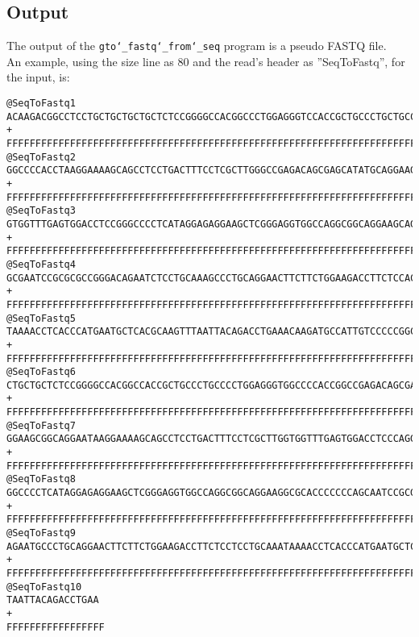 \subsection*{Output}
The output of the \texttt{gto\char`_fastq\char`_from\char`_seq} program is a pseudo FASTQ file.\\
An example, using the size line as 80 and the read's header as ''SeqToFastq'', for the input, is:
\begin{lstlisting}
@SeqToFastq1
ACAAGACGGCCTCCTGCTGCTGCTGCTCTCCGGGGCCACGGCCCTGGAGGGTCCACCGCTGCCCTGCTGCCATTGTCCCC
+
FFFFFFFFFFFFFFFFFFFFFFFFFFFFFFFFFFFFFFFFFFFFFFFFFFFFFFFFFFFFFFFFFFFFFFFFFFFFFFFF
@SeqToFastq2
GGCCCCACCTAAGGAAAAGCAGCCTCCTGACTTTCCTCGCTTGGGCCGAGACAGCGAGCATATGCAGGAAGCGGCAGGAA
+
FFFFFFFFFFFFFFFFFFFFFFFFFFFFFFFFFFFFFFFFFFFFFFFFFFFFFFFFFFFFFFFFFFFFFFFFFFFFFFFF
@SeqToFastq3
GTGGTTTGAGTGGACCTCCGGGCCCCTCATAGGAGAGGAAGCTCGGGAGGTGGCCAGGCGGCAGGAAGCAGGCCAGTGCC
+
FFFFFFFFFFFFFFFFFFFFFFFFFFFFFFFFFFFFFFFFFFFFFFFFFFFFFFFFFFFFFFFFFFFFFFFFFFFFFFFF
@SeqToFastq4
GCGAATCCGCGCGCCGGGACAGAATCTCCTGCAAAGCCCTGCAGGAACTTCTTCTGGAAGACCTTCTCCACCCCCCCAGC
+
FFFFFFFFFFFFFFFFFFFFFFFFFFFFFFFFFFFFFFFFFFFFFFFFFFFFFFFFFFFFFFFFFFFFFFFFFFFFFFFF
@SeqToFastq5
TAAAACCTCACCCATGAATGCTCACGCAAGTTTAATTACAGACCTGAAACAAGATGCCATTGTCCCCCGGCCTCCTGCTG
+
FFFFFFFFFFFFFFFFFFFFFFFFFFFFFFFFFFFFFFFFFFFFFFFFFFFFFFFFFFFFFFFFFFFFFFFFFFFFFFFF
@SeqToFastq6
CTGCTGCTCTCCGGGGCCACGGCCACCGCTGCCCTGCCCCTGGAGGGTGGCCCCACCGGCCGAGACAGCGAGCATATGCA
+
FFFFFFFFFFFFFFFFFFFFFFFFFFFFFFFFFFFFFFFFFFFFFFFFFFFFFFFFFFFFFFFFFFFFFFFFFFFFFFFF
@SeqToFastq7
GGAAGCGGCAGGAATAAGGAAAAGCAGCCTCCTGACTTTCCTCGCTTGGTGGTTTGAGTGGACCTCCCAGGCCAGTGCCG
+
FFFFFFFFFFFFFFFFFFFFFFFFFFFFFFFFFFFFFFFFFFFFFFFFFFFFFFFFFFFFFFFFFFFFFFFFFFFFFFFF
@SeqToFastq8
GGCCCCTCATAGGAGAGGAAGCTCGGGAGGTGGCCAGGCGGCAGGAAGGCGCACCCCCCCAGCAATCCGCGCGCCGGGAC
+
FFFFFFFFFFFFFFFFFFFFFFFFFFFFFFFFFFFFFFFFFFFFFFFFFFFFFFFFFFFFFFFFFFFFFFFFFFFFFFFF
@SeqToFastq9
AGAATGCCCTGCAGGAACTTCTTCTGGAAGACCTTCTCCTCCTGCAAATAAAACCTCACCCATGAATGCTCACGCAAGTT
+
FFFFFFFFFFFFFFFFFFFFFFFFFFFFFFFFFFFFFFFFFFFFFFFFFFFFFFFFFFFFFFFFFFFFFFFFFFFFFFFF
@SeqToFastq10
TAATTACAGACCTGAA
+
FFFFFFFFFFFFFFFFF
\end{lstlisting}
